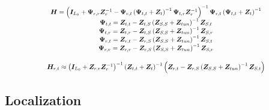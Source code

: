 \documentclass{beamer}
\newcommand{\mypause}{\pause}
\begin{document}
\begin{frame}

	
\begin{equation}
\scalebox{.77}{$
		\begin{array}{c}
		\bm{H} = \left( \bm{I}_{L_0} + \bm{\Psi}_{r,r} \bm{Z}_r^{-1} - \bm{\Psi}_{r,t} \left( \bm{\Psi}_{t,t} + \bm{Z}_t \right)^{-1} \bm{\Psi}_{t,r} \bm{Z}_r^{-1} \right)^{-1} \bm{\Psi}_{r,t} \left( \bm{\Psi}_{t,t} + \bm{Z}_t \right)^{-1} \\
		\bm{\Psi}_{t,t} = \bm{Z}_{t,t} - \bm{Z}_{t,S} \left( \bm{Z}_{S,S} + \bm{Z}_{tun} \right)^{-1} \bm{Z}_{S,t} \\
		\bm{\Psi}_{t,r} = \bm{Z}_{t,r} - \bm{Z}_{t,S} \left( \bm{Z}_{S,S} + \bm{Z}_{tun} \right)^{-1} \bm{Z}_{S,r} \\
		\bm{\Psi}_{r,t} = \bm{Z}_{r,t} - \bm{Z}_{r,S} \left( \bm{Z}_{S,S} + \bm{Z}_{tun} \right)^{-1} \bm{Z}_{S,t} \\
		\bm{\Psi}_{r,r} = \bm{Z}_{r,r} - \bm{Z}_{r,S} \left( \bm{Z}_{S,S} + \bm{Z}_{tun} \right)^{-1} \bm{Z}_{S,r}
	\end{array}
	$}
\end{equation}

\mypause

\begin{equation}
	\scalebox{.78}{$
\bm{H}_{r,t} \approx \left( \bm{I}_{L_0} + \bm{Z}_{r,r} \bm{Z}_r^{-1} \right)^{-1} \left( \bm{Z}_{t,t} + \bm{Z}_t \right)^{-1} \left( \bm{Z}_{r,t} - \bm{Z}_{r,S} \left( \bm{Z}_{S,S} + \bm{Z}_{tun} \right)^{-1} \bm{Z}_{S,t} \right)
	$}
\end{equation}
\end{frame}

\subsection{Localization}
\end{document}
